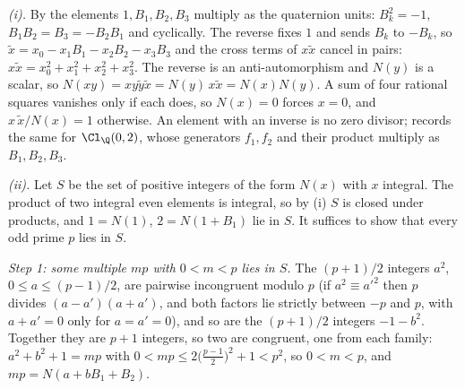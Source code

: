 \emph{(i).} By  the elements $1, B_{1}, B_{2}, B_{3}$ multiply as the quaternion units: $B_{k}^{2} = -1$, $B_{1}B_{2} = B_{3} = -B_{2}B_{1}$ and cyclically. The reverse fixes $1$ and sends $B_{k}$ to $-B_{k}$, so $\tilde{x} = x_{0} - x_{1}B_{1} - x_{2}B_{2} - x_{3}B_{3}$ and the cross terms of $x\tilde{x}$ cancel in pairs: $x\tilde{x} = x_{0}^{2} + x_{1}^{2} + x_{2}^{2} + x_{3}^{2}$. The reverse is an anti-automorphism and $N(y)$ is a scalar, so $N(xy) = xy\tilde{y}\tilde{x} = N(y)\,x\tilde{x} = N(x)N(y)$. A sum of four rational squares vanishes only if each does, so $N(x) = 0$ forces $x = 0$, and $x\,\tilde{x}/N(x) = 1$ otherwise. An element with an inverse is no zero divisor;  records the same for $\Cl_{\Q}(0,2)$, whose generators $f_{1}, f_{2}$ and their product multiply as $B_{1}, B_{2}, B_{3}$.

\emph{(ii).} Let $S$ be the set of positive integers of the form $N(x)$ with $x$ integral. The product of two integral even elements is integral, so by (i) $S$ is closed under products, and $1 = N(1)$, $2 = N(1 + B_{1})$ lie in $S$. It suffices to show that every odd prime $p$ lies in $S$.

\emph{Step 1: some multiple $mp$ with $0 < m < p$ lies in $S$.} The $(p+1)/2$ integers $a^{2}$, $0 \le a \le (p-1)/2$, are pairwise incongruent modulo $p$ (if $a^{2} \equiv a'^{2}$ then $p$ divides $(a - a')(a + a')$, and both factors lie strictly between $-p$ and $p$, with $a + a' = 0$ only for $a = a' = 0$), and so are the $(p+1)/2$ integers $-1 - b^{2}$. Together they are $p + 1$ integers, so two are congruent, one from each family: $a^{2} + b^{2} + 1 = mp$ with $0 < mp \le 2\bigl(\tfrac{p-1}{2}\bigr)^{2} + 1 < p^{2}$, so $0 < m < p$, and $mp = N(a + bB_{1} + B_{2})$.

